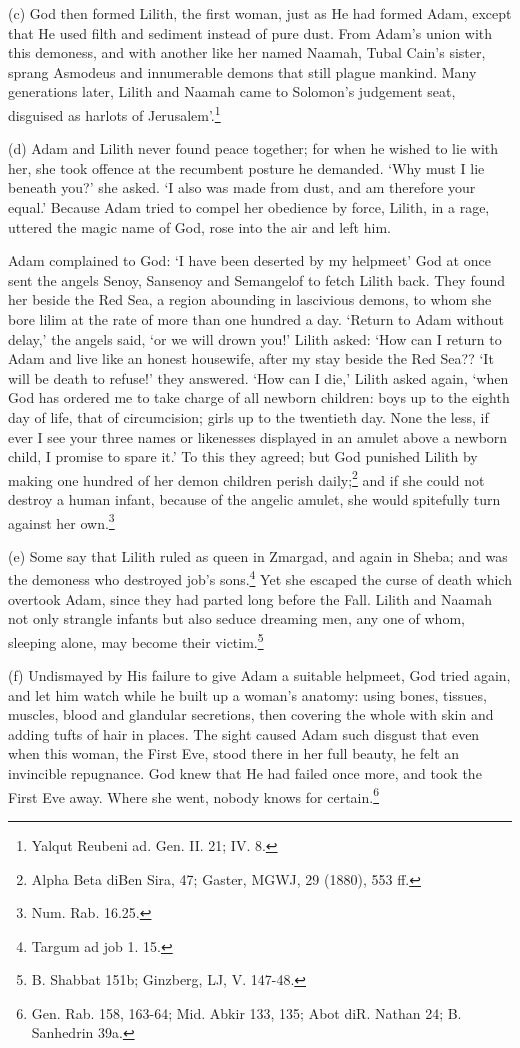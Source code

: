 \documentclass{article}
\begin{document}
(c) God then formed Lilith, the first woman, just as He had
formed Adam, except that He used filth and sediment instead of
pure dust. From Adam's union with this demoness, and with another
like her named Naamah, Tubal Cain's sister, sprang Asmodeus and
innumerable demons that still plague mankind. Many generations
later, Lilith and Naamah came to Solomon's judgement seat,
disguised as harlots of 
Jerusalem'.\footnote{Yalqut Reubeni ad. Gen. II. 21; IV. 8.}

(d) Adam and Lilith never found peace together; for when he
wished to lie with her, she took offence at the recumbent posture
he demanded. `Why must I lie beneath you?' she asked. `I also was
made from dust, and am therefore your equal.' Because Adam tried
to compel her obedience by force, Lilith, in a rage, uttered the
magic name of God, rose into the air and left him.

Adam complained to God: `I have been deserted by my helpmeet' God
at once sent the angels Senoy, Sansenoy and Semangelof to fetch
Lilith back. They found her beside the Red Sea, a region abounding
in lascivious demons, to whom she bore lilim at the rate of more
than one hundred a day. `Return to Adam without delay,' the angels
said, `or we will drown you!' Lilith asked: `How can I return to
Adam and live like an honest housewife, after my stay beside the
Red Sea?? `It will be death to refuse!' they answered. `How can I
die,' Lilith asked again, `when God has ordered me to take charge
of all newborn children: boys up to the eighth day of life, that
of circumcision; girls up to the twentieth day. None the less, if
ever I see your three names or likenesses displayed in an amulet
above a newborn child, I promise to spare it.' To this they
agreed; but God punished Lilith by making one hundred of her demon
children perish 
daily;\footnote{Alpha Beta diBen Sira, 47; Gaster, MGWJ, 29 (1880), 553 ff.}
and if she could not destroy a human
infant, because of the angelic amulet, she would spitefully turn
against her own.\footnote{Num. Rab. 16.25.}

(e) Some say that Lilith ruled as queen in Zmargad, and again in
Sheba; and was the demoness who destroyed job's 
sons.\footnote{Targum ad job 1. 15.} Yet she escaped the curse of death which 
overtook Adam, since they had parted long before the Fall. Lilith and 
Naamah not only strangle infants but also seduce dreaming men, any one of 
whom, sleeping alone, may become their 
victim.\footnote{B. Shabbat 151b; Ginzberg, LJ, V. 147-48.}

(f) Undismayed by His failure to give Adam a suitable helpmeet,
God tried again, and let him watch while he built up a woman's
anatomy: using bones, tissues, muscles, blood and glandular
secretions, then covering the whole with skin and adding tufts of
hair in places. The sight caused Adam such disgust that even when
this woman, the First Eve, stood there in her full beauty, he felt
an invincible repugnance. God knew that He had failed once more,
and took the First Eve away. Where she went, nobody knows for
certain.\footnote{Gen. Rab. 158, 163-64; Mid. Abkir 133, 135; 
Abot diR. Nathan 24; B. Sanhedrin 39a.}
\end{document}
